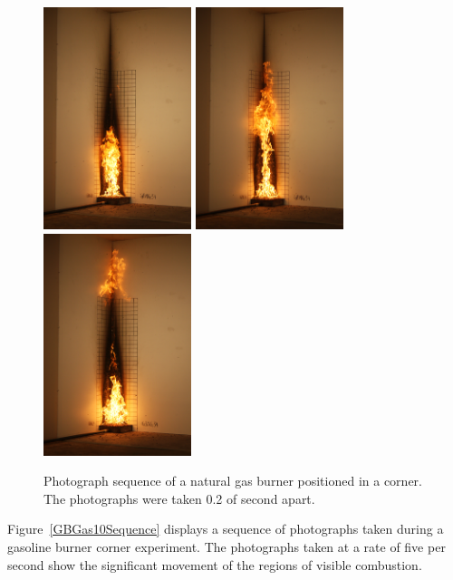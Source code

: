 \documentclass[twoside]{uocthesis}
\begin{document}
\begin{figure}[p]
	\includegraphics[width=1.7in]{../Figures/GBNG34_SequenceIMG_0996}
	\includegraphics[width=1.7in]{../Figures/GBNG34_SequenceIMG_0997}
	\includegraphics[width=1.7in]{../Figures/GBNG34_SequenceIMG_0998} \\
	

	\caption[Photograph sequence of a natural gas burner positioned in a corner.]{Photograph sequence of a natural gas burner positioned in a corner. The photographs were taken 0.2 of second apart.}
	\label{GBNG34Sequence}
\end{figure}

Figure~\ref{GBGas10Sequence} displays a sequence of photographs taken during a gasoline burner corner experiment.  The photographs taken at a rate of five per second show the significant movement of the regions of visible combustion.
\end{document}
